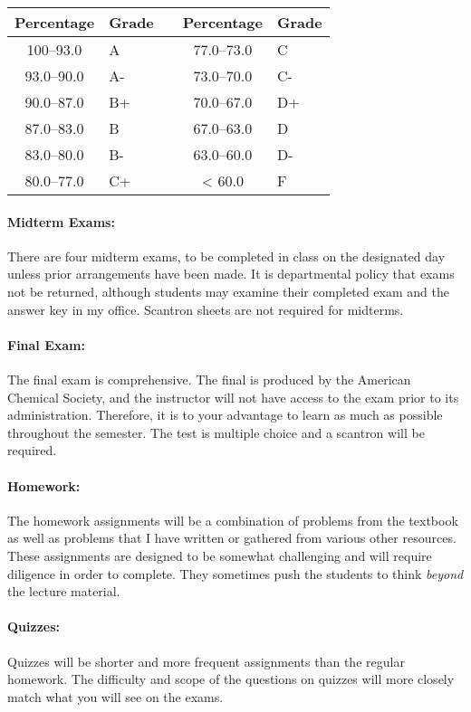 \documentclass[12pt, letterpaper]{article}
\begin{document}
\begin{tabular}{cl|c|cl}
	Percentage & Grade &  & Percentage & Grade \\ \midrule
	100--93.0  & A     &  & 77.0--73.0 & C     \\
	93.0--90.0 & A-    &  & 73.0--70.0 & C-    \\
	90.0--87.0 & B+    &  & 70.0--67.0 & D+    \\
	87.0--83.0 & B     &  & 67.0--63.0 & D     \\
	83.0--80.0 & B-    &  & 63.0--60.0 & D-    \\
	80.0--77.0 & C+    &  & < 60.0     & F
\end{tabular}
\paragraph{Midterm Exams:}
There are four midterm exams, to be completed in class on the designated day unless prior arrangements have been made. It is departmental policy that exams not be returned, although students may examine their completed exam and the answer key in my office. Scantron sheets are not required for midterms.

\paragraph{Final Exam:}
The final exam is comprehensive. The final is produced by the American Chemical Society, and the instructor will not have access to the exam prior to its administration. Therefore, it is to your advantage to learn as much as possible throughout the semester. The test is multiple choice and a scantron will be required.

\paragraph{Homework:}
The homework assignments will be a combination of problems from the textbook as well as problems that I have written or gathered from various other resources. These assignments are designed to be somewhat challenging and will require diligence in order to complete. They sometimes push the students to think \emph{beyond} the lecture material.

\paragraph{Quizzes:}
Quizzes will be shorter and more frequent assignments than the regular homework. The difficulty and scope of the questions on quizzes will more closely match what you will see on the exams.
\end{document}
